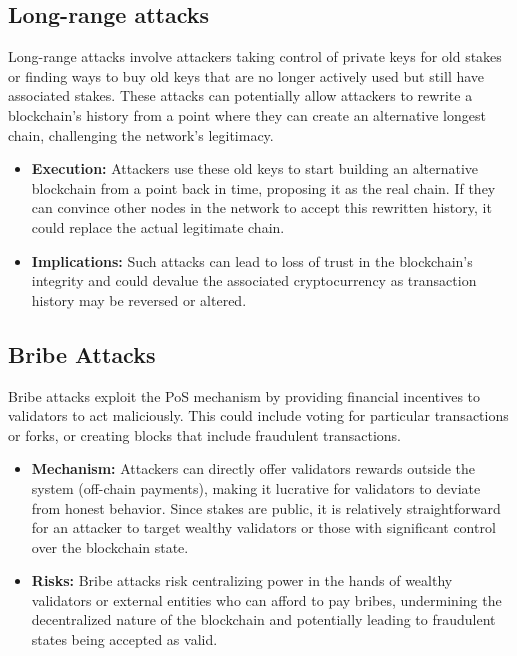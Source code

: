 \subsection{Long-range attacks}

Long-range attacks involve attackers taking control of private keys for old stakes or finding ways to buy old keys that are no longer actively used but still have associated stakes. These attacks can potentially allow attackers to rewrite a blockchain's history from a point where they can create an alternative longest chain, challenging the network's legitimacy.

\begin{itemize}
    \item \textbf{Execution:} Attackers use these old keys to start building an alternative blockchain from a point back in time, proposing it as the real chain. If they can convince other nodes in the network to accept this rewritten history, it could replace the actual legitimate chain.
    \item \textbf{Implications:} Such attacks can lead to loss of trust in the blockchain's integrity and could devalue the associated cryptocurrency as transaction history may be reversed or altered.
\end{itemize}

\subsection{Bribe Attacks}

Bribe attacks exploit the PoS mechanism by providing financial incentives to validators to act maliciously. This could include voting for particular transactions or forks, or creating blocks that include fraudulent transactions.

\begin{itemize}
    \item \textbf{Mechanism:} Attackers can directly offer validators rewards outside the system (off-chain payments), making it lucrative for validators to deviate from honest behavior. Since stakes are public, it is relatively straightforward for an attacker to target wealthy validators or those with significant control over the blockchain state.
    \item \textbf{Risks:} Bribe attacks risk centralizing power in the hands of wealthy validators or external entities who can afford to pay bribes, undermining the decentralized nature of the blockchain and potentially leading to fraudulent states being accepted as valid.
\end{itemize}


